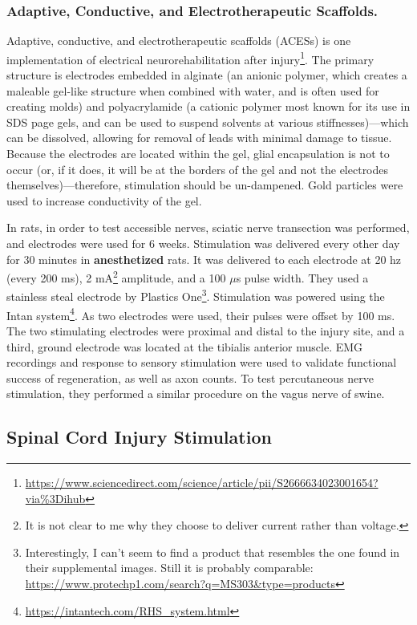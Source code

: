 \documentclass[12pt]{report}
\begin{document}
\subsubsection{Adaptive, Conductive, and
Electrotherapeutic Scaffolds.}
Adaptive, conductive, and electrotherapeutic scaffolds (ACESs) is one implementation of electrical neurorehabilitation after injury\footnote{\url{https://www.sciencedirect.com/science/article/pii/S2666634023001654?via\%3Dihub}}. The primary structure is electrodes embedded in alginate (an anionic polymer, which creates a maleable gel-like structure when combined with water, and is often used for creating molds) and polyacrylamide (a cationic polymer most known for its use in SDS page gels, and can be used to suspend solvents at various stiffnesses)---which can be dissolved, allowing for removal of leads with minimal damage to tissue. Because the electrodes are located within the gel, glial encapsulation is not to occur (or, if it does, it will be at the borders of the gel and not the electrodes themselves)---therefore, stimulation should be un-dampened. Gold particles were used to increase conductivity of the gel.\newline

In rats, in order to test accessible nerves, sciatic nerve transection was performed, and electrodes were used for 6 weeks. Stimulation was delivered every other day for 30 minutes in \textbf{anesthetized} rats. It was delivered to each electrode at 20 hz (every 200 ms), 2 mA\footnote{It is not clear to me why they choose to deliver current rather than voltage.} amplitude, and a 100 $\mu$s pulse width. They used a stainless steal electrode by Plastics One\footnote{Interestingly, I can't seem to find a product that resembles the one found in their supplemental images. Still it is probably comparable: \url{https://www.protechp1.com/search?q=MS303\&type=products}}. Stimulation was powered using the Intan system\footnote{\url{https://intantech.com/RHS_system.html}}. As two electrodes were used, their pulses were offset by 100 ms. The two stimulating electrodes were proximal and distal to the injury site, and a third, ground electrode was located at the tibialis anterior muscle. EMG recordings and response to sensory stimulation were used to validate functional success of regeneration, as well as axon counts. To test percutaneous nerve stimulation, they performed a similar procedure on the vagus nerve of swine.  



\subsection{Spinal Cord Injury Stimulation}
\end{document}
